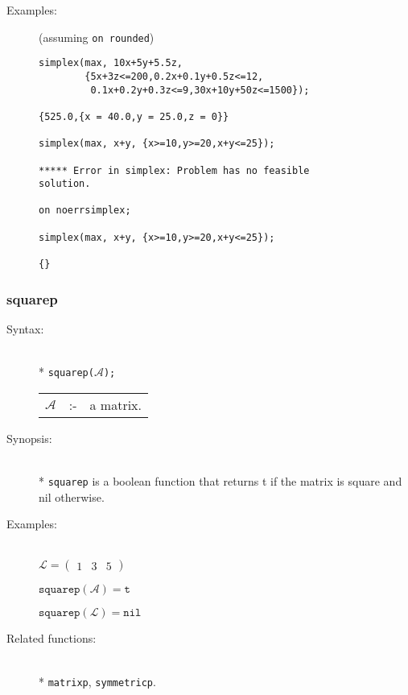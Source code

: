 \begin{description}
\item[Examples:] (assuming \texttt{on rounded}) \\
\begin{verbatim}
simplex(max, 10x+5y+5.5z,
        {5x+3z<=200,0.2x+0.1y+0.5z<=12,
         0.1x+0.2y+0.3z<=9,30x+10y+50z<=1500});

{525.0,{x = 40.0,y = 25.0,z = 0}}

simplex(max, x+y, {x>=10,y>=20,x+y<=25});

***** Error in simplex: Problem has no feasible
solution.

on noerrsimplex;

simplex(max, x+y, {x>=10,y>=20,x+y<=25});

{}
\end{verbatim}
\end{description}


\subsubsection{squarep}
\label{linalg:squarep}
\hypertarget{operator:SQUAREP}{}

\begin{description}
\item[Syntax:]\mbox{}\\*
\texttt{squarep($\mathcal{A}$);}\\[2mm]
\begin{tabular}{l l l}
$\mathcal{A}$ &:-& a matrix.
\end{tabular}

\item[Synopsis:]\mbox{}\\*
\texttt{squarep} is a boolean function that returns t if
                the matrix is square and nil otherwise.

\item[Examples:]\mbox{}\\
  \(\mathcal{L} = \begin{pmatrix} 1 & 3 & 5 \end{pmatrix}\)

  \(\texttt{squarep}(\mathcal{A}) = \texttt{t}\)

  \(\texttt{squarep}(\mathcal{L}) = \texttt{nil}\)

\item[Related functions:]\mbox{}\\*
\texttt{matrixp}, \texttt{symmetricp}.
\end{description}


